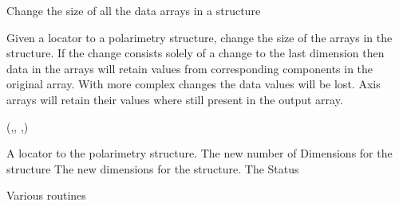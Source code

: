 \begin{manroutinedescription}
     Change the size of all the data arrays in a structure

     Given a locator to a polarimetry structure, change the
     size of the arrays in the structure. If the change
     consists solely of a change to the last dimension then
     data in the arrays will retain values from corresponding
     components in the original array. With more complex
     changes the data values will be lost. Axis arrays will
     retain their values where still present in the output array.

     {}

     {} {} ({},{},{%
},{})

\begin{manparametertable}
 A locator %
to the polarimetry
                       structure.
 The new number of %
Dimensions for
                       the structure
 The new %
dimensions for the
                       structure.
 The Status

\end{manparametertable}
     Various {} routines
\end{manroutinedescription}
